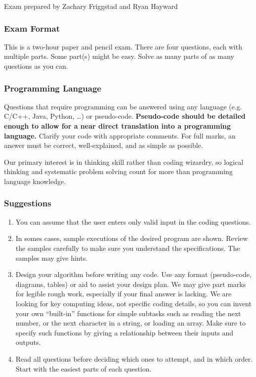 \documentclass[12pt]{article}
\begin{document}
\vfill
\hfill{\small Exam prepared by Zachary Friggstad and Ryan Hayward}\hfill~
\newpage
\subsubsection*{Exam Format}

This is a two-hour paper and pencil exam. 
There are four questions, each with multiple parts.
Some part(s) might be easy.
Solve as many parts of as many questions as you can.  

\subsubsection*{Programming Language}

Questions that require programming can be answered
using any language (e.g.~ C/C++, Java, Python, \ldots) or pseudo-code. 
{\bf Pseudo-code should be detailed enough to
  allow for a near direct translation into a programming
  language.}
Clarify your code with appropriate comments.
For full marks, an answer must be correct, 
well-explained, and as simple as possible.

Our primary interest is in thinking skill rather 
than coding wizardry, so logical thinking 
and systematic problem solving count for more than 
programming language knowledge.

\subsubsection*{Suggestions}
\begin{enumerate}
\item You can assume that the user enters only valid input in the coding questions.
\item In somes cases, sample executions of the desired program are shown.
Review the samples carefully to make sure you understand 
the specifications. The samples may give hints. 
\item Design your algorithm before writing any code.
  Use any format (pseudo-code, diagrams, tables) or aid 
  to assist your design plan. 
  We may give part marks for legible rough work,
  especially if your final answer is lacking.
  We are looking for key computing ideas, not specific coding details, 
  so you can invent your own ``built-in'' 
  functions for simple subtasks such as reading
  the next number, or the next character in a string, or loading an
  array.  Make sure to specify such functions by giving a 
  relationship between their inputs and outputs. 
\item Read all questions before deciding which ones
  to attempt, and in which order.  Start with the easiest parts of
  each question.  
\end{enumerate}
\end{document}
